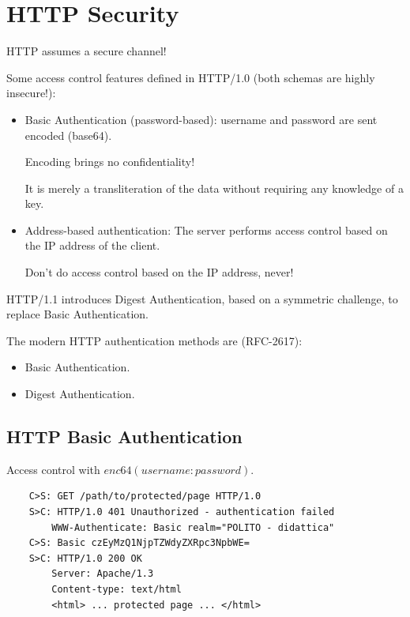 \section{HTTP Security}
\begin{center}
    \large{HTTP assumes a secure channel!}
\end{center}

Some access control features defined in HTTP/1.0 (both schemas are highly insecure!):
\begin{itemize}
    \item Basic Authentication (password-based): username and password are sent encoded (base64).
    \begin{tcolorbox}[colback=red!10!white, colframe=red!70!black, coltitle=white, title=Beware]
        Encoding brings no confidentiality!

        It is merely a transliteration of the data without requiring any knowledge of a key.
        \end{tcolorbox}
    \item Address-based authentication: The server performs access control based on the IP address of the client.
    \begin{tcolorbox}[colback=red!10!white, colframe=red!70!black, coltitle=white, title=Beware]
    Don't do access control based on the IP address, never!
    \end{tcolorbox}
\end{itemize}

HTTP/1.1 introduces Digest Authentication, based on a symmetric challenge, to replace Basic Authentication.


\clearpage

\noindent The modern HTTP authentication methods are (RFC-2617):
\begin{itemize}
    \item Basic Authentication.
    \item Digest Authentication.
\end{itemize}

\subsection{HTTP Basic Authentication}
\begin{center}
    Access control with $enc64 (username:password)$.
\end{center}
\begin{verbatim}
    C>S: GET /path/to/protected/page HTTP/1.0
    S>C: HTTP/1.0 401 Unauthorized - authentication failed
        WWW-Authenticate: Basic realm="POLITO - didattica"
    C>S: Basic czEyMzQ1NjpTZWdyZXRpc3NpbWE=
    S>C: HTTP/1.0 200 OK
        Server: Apache/1.3
        Content-type: text/html
        <html> ... protected page ... </html>
\end{verbatim}

